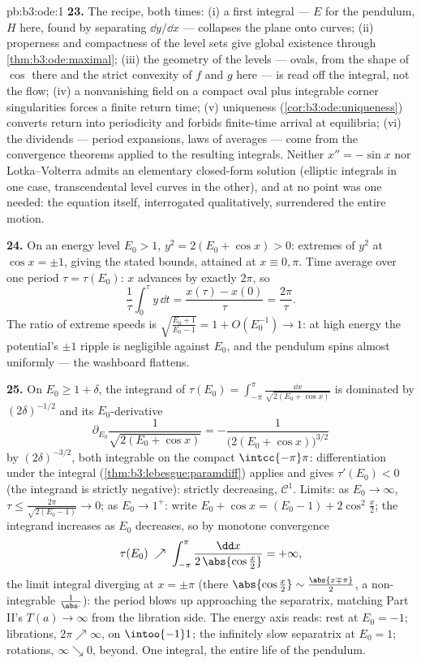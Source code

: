 \begin{solution}{pb:b3:ode:1}
\textbf{23.} The recipe, both times: (i) a first integral
--- $E$ for the pendulum, $H$ here, found by separating
$\dd y/\dd x$ --- collapses the plane onto curves; (ii)
properness and compactness of the level sets give global
existence through \cref{thm:b3:ode:maximal}; (iii) the
geometry of the levels --- ovals, from the shape of $\cos$
there and the strict convexity of $f$ and $g$ here --- is
read off the integral, not the flow; (iv) a nonvanishing
field on a compact oval plus integrable corner singularities
forces a finite return time; (v) uniqueness
(\cref{cor:b3:ode:uniqueness}) converts return into
periodicity and forbids finite-time arrival at equilibria;
(vi) the dividends --- period expansions, laws of averages
--- come from the convergence theorems applied to the
resulting integrals. Neither $x'' = -\sin x$ nor
Lotka--Volterra admits an elementary closed-form solution
(elliptic integrals in one case, transcendental level curves
in the other), and at no point was one needed: the equation
itself, interrogated qualitatively, surrendered the entire
motion.

\textbf{24.} On an energy level $E_0 > 1$, $y^2 = 2(E_0 +
\cos x) > 0$: extremes of $y^2$ at $\cos x = \pm1$, giving
the stated bounds, attained at $x \equiv 0, \pi$. Time
average over one period $\tau = \tau(E_0)$: $x$ advances by
exactly $2\pi$, so
\[
\frac1\tau\int_0^\tau y\,\dd t = \frac{x(\tau) -
x(0)}{\tau} = \frac{2\pi}\tau .
\]
The ratio of extreme speeds is $\sqrt{\frac{E_0 + 1}{E_0 -
1}} = 1 + O(E_0^{-1}) \to 1$: at high energy the potential's
$\pm1$ ripple is negligible against $E_0$, and the pendulum
spins almost uniformly --- the washboard flattens.

\textbf{25.} On $E_0 \geq 1 + \delta$, the integrand of
$\tau(E_0) = \int_{-\pi}^{\pi}\frac{\dd x}{\sqrt{2(E_0 +
\cos x)}}$ is dominated by $(2\delta)^{-1/2}$ and its
$E_0$-derivative
\[
\partial_{E_0}\frac1{\sqrt{2(E_0 + \cos x)}}
= -\frac{1}{\bigl(2(E_0 + \cos x)\bigr)^{3/2}}
\]
by $(2\delta)^{-3/2}$, both integrable on the compact
$\intcc{-\pi}\pi$: differentiation under the integral
(\cref{thm:b3:lebesgue:paramdiff}) applies and gives
$\tau'(E_0) < 0$ (the integrand is strictly negative):
strictly decreasing, $\mathcal C^1$. Limits: as $E_0 \to
\infty$, $\tau \leq \frac{2\pi}{\sqrt{2(E_0 - 1)}} \to 0$;
as $E_0 \to 1^+$: write $E_0 + \cos x = (E_0 - 1) +
2\cos^2\frac x2$; the integrand increases as $E_0$
decreases, so by monotone convergence
\[
\tau(E_0) \;\nearrow\;
\int_{-\pi}^{\pi}\frac{\dd x}{2\,\abs{\cos\frac x2}}
= +\infty,
\]
the limit integral diverging at $x = \pm\pi$ (there
$\abs{\cos\frac x2} \sim \frac{\abs{x \mp \pi}}2$, a
non-integrable $\frac1{\abs\cdot}$): the period blows up
approaching the separatrix, matching Part II's $T(a) \to
\infty$ from the libration side. The energy
axis reads: rest at $E_0 = -1$; librations, $2\pi \nearrow
\infty$, on $\intoo{-1}1$; the infinitely slow separatrix at
$E_0 = 1$; rotations, $\infty \searrow 0$, beyond. One
integral, the entire life of the pendulum.
\end{solution}
